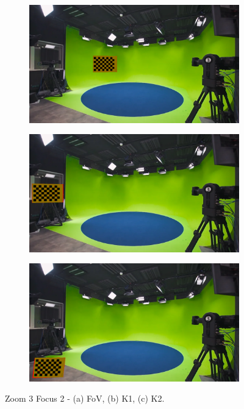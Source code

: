 \begin{figure}[h]
    \centering
    \begin{subfigure}[b]{0.45\textwidth}
        \includegraphics[width=\textwidth]{Images/08annex/results/6.2.png}
        \caption{}
        \label{fig:a2}
    \end{subfigure}
    \hfill
    \begin{subfigure}[b]{0.45\textwidth}
        \includegraphics[width=\textwidth]{Images/08annex/results/6.3.png}
        \caption{}
        \label{fig:b2}
    \end{subfigure}
    
    \vspace{0.5cm}
    
    \begin{subfigure}[b]{0.45\textwidth}
        \includegraphics[width=\textwidth]{Images/08annex/results/6.4.png}
        \caption{}
        \label{fig:c2}
    \end{subfigure}

    \caption{Zoom 3 Focus 2 - (a) FoV, (b) K1, (c) K2.}
    \label{fig:vir_fov_cal}
\end{figure}


